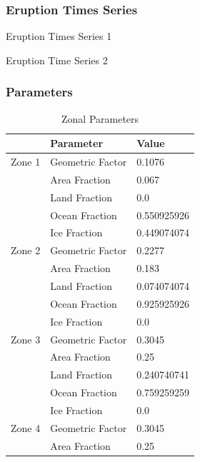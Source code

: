 \documentclass{article}
\begin{document}
\begin{appendices}
\subsubsection{Eruption Times Series}
\begin{table}[H]
    \parbox{.45\linewidth}{
    \captionsetup{singlelinecheck = false, justification=justified}
    \caption{Eruption Times Series 1}
    \label{tab:erupt1}
    }
    \hfill
    \parbox{.45\linewidth}{
    \captionsetup{singlelinecheck = false, justification=justified}
    \caption{Eruption Time Series 2}
    \label{tab:erupt2}
    }
\end{table}

\subsubsection{Parameters}
\begin{table}[H]
    \parbox{.45\linewidth}{
    \captionsetup{singlelinecheck = false, justification=justified}
    \caption{Zonal Parameters}
    \begin{tabular}{lll}
    \hline
     & Parameter & Value \\
    \hline
    Zone 1 & Geometric Factor & 0.1076 \\
     & Area Fraction & 0.067 \\
     & Land Fraction & 0.0 \\
     & Ocean Fraction & 0.550925926 \\ 
     & Ice Fraction & 0.449074074 \\
    \hline
    Zone 2 & Geometric Factor & 0.2277 \\
     & Area Fraction & 0.183 \\
     & Land Fraction & 0.074074074 \\
     & Ocean Fraction & 0.925925926 \\ 
     & Ice Fraction & 0.0\\
    \hline
    Zone 3 & Geometric Factor & 0.3045 \\
     & Area Fraction & 0.25 \\
     & Land Fraction & 0.240740741 \\
     & Ocean Fraction & 0.759259259 \\ 
     & Ice Fraction & 0.0\\
    \hline
    Zone 4 & Geometric Factor & 0.3045 \\
     & Area Fraction & 0.25 \\

\end{tabular}}
\end{table}
\end{appendices}
\end{document}
